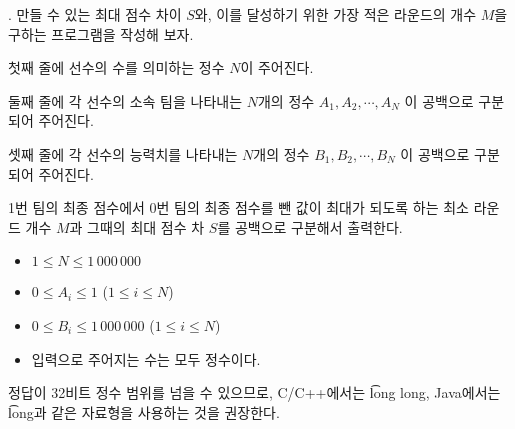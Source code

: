 \begin{problem}{\probno{}. \probtitle{}}
만들 수 있는 최대 점수 차이 $S$와, 이를 달성하기 위한 가장 적은 라운드의 개수 $M$을 구하는 프로그램을 작성해 보자.

\InputFile
첫째 줄에 선수의 수를 의미하는 정수 $N$이 주어진다.

둘째 줄에 각 선수의 소속 팀을 나타내는 $N$개의 정수 $A_1, A_2, \cdots, A_N$ 이 공백으로 구분되어 주어진다.

셋째 줄에 각 선수의 능력치를 나타내는 $N$개의 정수 $B_1, B_2, \cdots, B_N$ 이 공백으로 구분되어 주어진다.

\OutputFile
1번 팀의 최종 점수에서 0번 팀의 최종 점수를 뺀 값이 최대가 되도록 하는 최소 라운드 개수 $M$과 그때의 최대 점수 차 $S$를 공백으로 구분해서 출력한다.

\newpage
\Constraints
\begin{itemize}[topsep=0pt,noitemsep]
    \item $1 \le N \le 1\,000\,000$
    \item $0 \le A_i \le 1$ ($1 \le i \le N$)
    \item $0 \le B_i \le 1\,000\,000$ ($1 \le i \le N$)
    \item 입력으로 주어지는 수는 모두 정수이다.
\end{itemize}

\Examples

\begin{example}
%
%
\end{example}

\Notes

정답이 32비트 정수 범위를 넘을 수 있으므로, C/C++에서는 \t{long long}, Java에서는 \t{long}과 같은 자료형을 사용하는 것을 권장한다.

\end{problem}